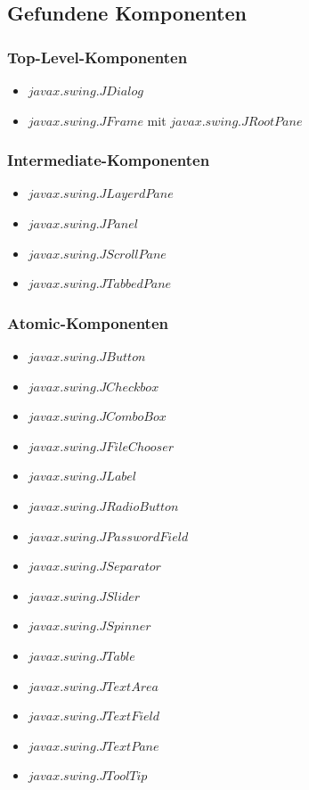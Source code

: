   \subsection{Gefundene Komponenten}
  
  \subsubsection{Top-Level-Komponenten}
  
  \begin{itemize}
    \item \(javax.swing.JDialog\)
    \item \(javax.swing.JFrame\) mit \(javax.swing.JRootPane\)
  \end{itemize}
  
  \subsubsection{Intermediate-Komponenten}
  
  \begin{itemize}
    \item \(javax.swing.JLayerdPane\)
    \item \(javax.swing.JPanel\)
    \item \(javax.swing.JScrollPane\)
    \item \(javax.swing.JTabbedPane\)
  \end{itemize}
  
  \subsubsection{Atomic-Komponenten}
  \begin{itemize}
    \item \(javax.swing.JButton\)
    \item \(javax.swing.JCheckbox\)
    \item \(javax.swing.JComboBox\)
    \item \(javax.swing.JFileChooser\)
    \item \(javax.swing.JLabel\)
    \item \(javax.swing.JRadioButton\)
    \item \(javax.swing.JPasswordField\)
    \item \(javax.swing.JSeparator\)
    \item \(javax.swing.JSlider\)
    \item \(javax.swing.JSpinner\)
    \item \(javax.swing.JTable\)
    \item \(javax.swing.JTextArea\)
    \item \(javax.swing.JTextField\)
    \item \(javax.swing.JTextPane\)
    \item \(javax.swing.JToolTip\)
  \end{itemize}
  
